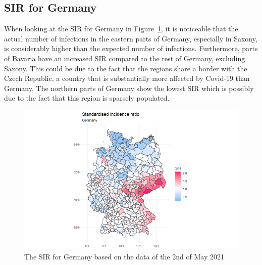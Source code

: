 \subsection{SIR for Germany}
When looking at the SIR for Germany in Figure~\ref{sirgermany}, it is noticeable that the actual number of infections in the eastern parts of Germany, especially in Saxony, is considerably higher than the expected number of infections. Furthermore, parts of Bavaria have an increased SIR compared to the rest of Germany, excluding Saxony. This could be due to the fact that the regions share a border with the Czech Republic, a country that is substantially more affected by Covid-19 than Germany. The northern parts of Germany show the lowest SIR which is possibly due to the fact that this region is sparsely populated.
\begin{figure}[H]
 \centering
 \includegraphics[width = 1.2\textwidth]{sir_germany.png}
 \caption{The SIR for Germany based on the data of the 2nd of May 2021}
 \label{sirgermany}
\end{figure}
